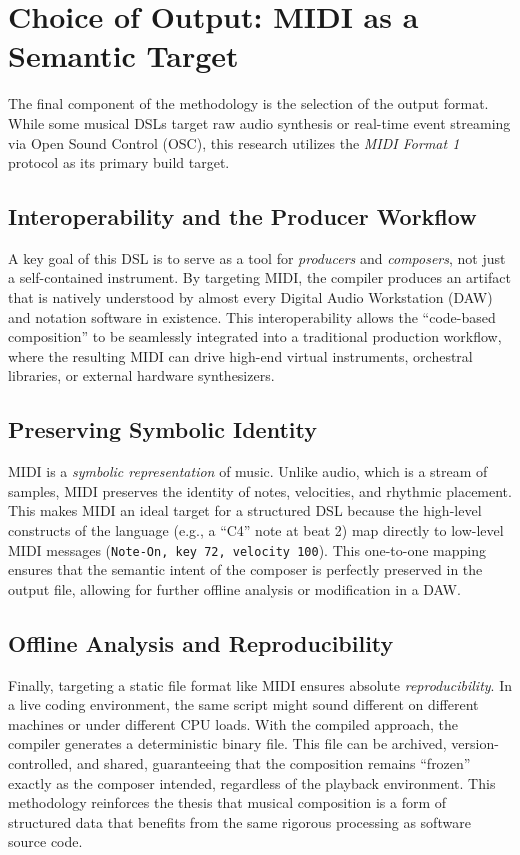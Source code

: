 \section{Choice of Output: MIDI as a Semantic Target}\label{sec:midi-target}

The final component of the methodology is the selection of the output format.
While some musical DSLs target raw audio synthesis or real-time event streaming via Open Sound Control (OSC), this
research utilizes the \textit{MIDI Format 1} protocol as its primary build target.

\subsection{Interoperability and the Producer Workflow}\label{subsec:interoperability-and-the-producer-workflow}

A key goal of this DSL is to serve as a tool for \textit{producers} and \textit{composers}, not just a self-contained
instrument.
By targeting MIDI, the compiler produces an artifact that is natively understood by almost every Digital Audio
Workstation (DAW) and notation software in existence.
This interoperability allows the ``code-based composition'' to be seamlessly integrated into a traditional production
workflow, where the resulting MIDI can drive high-end virtual instruments, orchestral libraries, or external hardware
synthesizers.

\subsection{Preserving Symbolic Identity}\label{subsec:preserving-symbolic-identity}

MIDI is a \textit{symbolic representation} of music.
Unlike audio, which is a stream of samples, MIDI preserves the identity of notes, velocities, and rhythmic placement.
This makes MIDI an ideal target for a structured DSL because the high-level constructs of the language (e.g., a ``C4''
note at beat 2) map directly to low-level MIDI messages (\texttt{Note-On, key 72, velocity 100}).
This one-to-one mapping ensures that the semantic intent of the composer is perfectly preserved in the output file,
allowing for further offline analysis or modification in a DAW\@.

\subsection{Offline Analysis and Reproducibility}\label{subsec:offline-analysis-and-reproducibility}

Finally, targeting a static file format like MIDI ensures absolute \textit{reproducibility}.
In a live coding environment, the same script might sound different on different machines or under different CPU loads.
With the compiled approach, the compiler generates a deterministic binary file.
This file can be archived, version-controlled, and shared, guaranteeing that the composition remains ``frozen'' exactly
as the composer intended, regardless of the playback environment.
This methodology reinforces the thesis that musical composition is a form of structured data that benefits from the same
rigorous processing as software source code.
